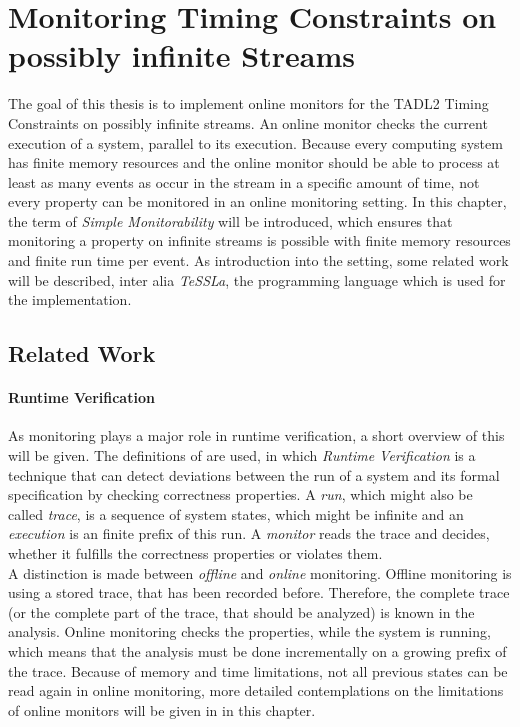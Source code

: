 
\chapter{Monitoring Timing Constraints on possibly infinite Streams}
\label{chapter-monitorability}
	The goal of this thesis is to implement online monitors for the TADL2 Timing Constraints on possibly infinite streams. An online monitor checks the current execution of a system, parallel to its execution. Because every computing system has finite memory resources and the online monitor should be able to process at least as many events as occur in the stream in a specific amount of time, not every property can be monitored in an online monitoring setting. In this chapter, the term of \emph{Simple Monitorability} will be introduced, which ensures that monitoring a property on infinite streams is possible with finite memory resources and finite run time per event. As introduction into the setting, some related work will be described, inter alia \emph{TeSSLa}, the programming language which is used for the implementation.

\section{Related Work}

	\subsubsection{Runtime Verification}
		As monitoring plays a major role in runtime verification, a short overview of this will be given. The definitions of \cite{RuntimeVerification} are used, in which \emph{Runtime Verification} is a technique that can detect deviations between the run of a system and its formal specification by checking correctness properties. A \emph{run}, which might also be called \emph{trace}, is a sequence of system states, which might be infinite and an \emph{execution} is an finite prefix of this run. A \emph{monitor} reads the trace and decides, whether it fulfills the correctness properties or violates them.\\
		A distinction is made between \emph{offline} and \emph{online} monitoring. Offline monitoring is using a stored trace, that has been recorded before. Therefore, the complete trace (or the complete part of the trace, that should be analyzed) is known in the analysis. Online monitoring checks the properties, while the system is running, which means that the analysis must be done incrementally on a growing prefix of the trace. Because of memory and time limitations, not all previous states can be read again in online monitoring, more detailed contemplations on the limitations of online monitors will be given in in this chapter.

